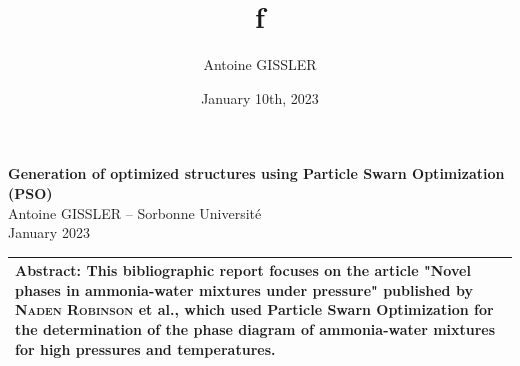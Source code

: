 \documentclass[11pt]{article}
\title{\textsf{\textbf{f}}}
\author{Antoine GISSLER}
\date{January 10th, 2023}
\begin{document}
\noindent\huge\textbf{\textsf{Generation of optimized structures using Particle Swarn Optimization (PSO)}}\normalsize\vspace{1em}\\
\large \textsf{Antoine GISSLER -- Sorbonne Université\\January 2023}\vspace{0.5em}\\
\begin{tabular}{p{18cm}}
    \hline
    \vspace{-0.25em}\begin{minipage}{\textwidth}
        \small\textbf{Abstract:} This bibliographic report focuses on the article "Novel phases in ammonia-water mixtures under pressure" published by \textsc{Naden Robinson} et al., which used Particle Swarn Optimization for the determination of the phase diagram of ammonia-water mixtures for high pressures and temperatures.\normalsize
    \end{minipage}\vspace{0.5em}
    \\
    \hline
\end{tabular}
\end{document}
